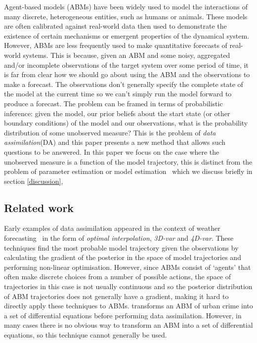 \documentclass{article}
\begin{document}
Agent-based models (ABMs) have been widely used to model the interactions of many discrete, heterogeneous entities, such as humans or animals. These models are often calibrated against real-world data then used to demonstrate the existence of certain mechanisms or emergent properties of the dynamical system. However, ABMs are less frequently used to make quantitative forecasts of real-world systems. This is because, given an ABM and some noisy, aggregated and/or incomplete observations of the target system over some period of time, it is far from clear how we should go about using the ABM and the observations to make a forecast. The observations don't generally specify the complete state of the model at the current time so we can't simply run the model forward to produce a forecast. The problem can be framed in terms of probabilistic inference: given the model, our prior beliefs about the start state (or other boundary conditions) of the model and our observations, what is the probability distribution of some unobserved measure? This is the problem of \textit{data assimilation}(DA) and this paper presents a new method that allows such questions to be answered. In this paper we focus on the case where the unobserved measure is a function of the model trajectory, this is distinct from the problem of parameter estimation or model estimation~\citep{thiele_facilitating_2014} which we discuss briefly in section \ref{discussion},

\subsection{Related work}

Early examples of data assimilation appeared in the context of weather forecasting~\citep*{talagrand_assimilation_1997, kalnay_atmospheric_2003, lewis_dynamic_2006} in the form of \textit{optimal interpolation}\citep{sasaki1958objective}, \textit{3D-var}\citep{lorenc1986analysis} and \textit{4D-var}\citep{courtier1990variational}. These techniques find the most probable model trajectory given the observations by calculating the gradient of the posterior in the space of model trajectories and performing non-linear optimisation. However, since ABMs consist of `agents' that often make discrete choices from a number of possible actions, the space of trajectories in this case is not usually continuous and so the posterior distribution of ABM trajectories does not generally have a gradient, making it hard to directly apply these techniques to ABMs. \citet{lloyd_exploring_2016} transforms an ABM of urban crime into a set of differential equations before performing data assimilation. However, in many cases there is no obvious way to transform an ABM into a set of differential equations, so this technique cannot generally be used.
\end{document}
